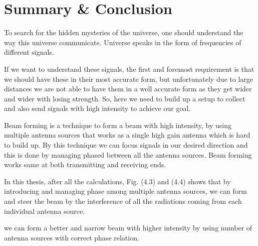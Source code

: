 \chapter{Summary \& Conclusion}

To search for the hidden mysteries of the universe, one should understand the way this universe communicate. Universe speaks in the form of frequencies of different signals.

If we want to understand these signals, the first and foremost requirement is that we should have these in their most accurate form, but unfortunately due to large distances we are not able to have them in a well accurate form as they get wider and wider with losing strength. So, here we need to build up a setup to collect and also send signals with high intensity to achieve our goal.

Beam forming is a technique to form a beam with high intensity, by using multiple antenna sources that works as a single high gain antenna which is hard to build up. By this technique we can focus signals in our desired direction and this is done by managing phased between all the antenna sources. Beam forming works same at both transmitting and receiving ends.

In this thesis, after all the calculations, Fig. (4.3) and (4.4) shows that by introducing and managing phase among multiple antenna sources, we can form and steer the beam by the interference of all the radiations coming from each individual antenna source.

we can form a better and narrow beam with higher intensity by using number of antenna sources with correct phase relation.
